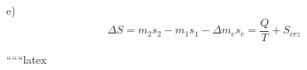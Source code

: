 e)
\begin{equation}
\Delta S = m_2 s_2 - m_1 s_1 - \Delta m_e s_e = \frac{Q}{T} + S_{crz}
\end{equation}

``````latex